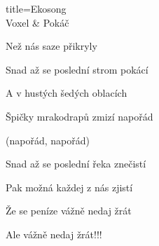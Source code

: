 \begin{song}{title=\predtitle\centering Ekosong\\\large Voxel \& Pokáč \vspace*{-0.3cm}}
{\begin{varwidth}[t]{0.5\textwidth}
Než nás saze přikryly


Snad až se poslední strom pokácí

A v hustých šedých oblacích

Špičky mrakodrapů zmizí napořád 

(napořád, napořád)

Snad až se poslední řeka znečistí

Pak možná každej z nás zjistí

Že se peníze vážně nedaj žrát

Ale vážně nedaj žrát!!!
   
\end{varwidth}   
}
\setcounter{Slokočet}{0}
\end{song}

